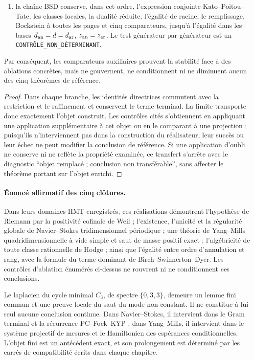\begin{proposition}
\begin{enumerate}
 \item la chaîne BSD conserve, dans cet ordre, l'expression conjointe Kato--Poitou--Tate, les classes locales, la dualité réduite, l'égalité de racine, le remplissage, Bockstein à toutes les pages et cinq comparateurs, jusqu'à l'égalité dans les bases \(d_{\rm an}=d=d_{\rm ar}\), \(z_{\rm an}=z_{\rm ar}\). Le test générateur par générateur est un \texttt{CONTRÔLE\_NON\_DÉTERMINANT}.
\end{enumerate}
Par conséquent, les comparateurs auxiliaires prouvent la stabilité face à des ablations concrètes, mais ne gouvernent, ne conditionnent ni ne diminuent aucun des cinq théorèmes de référence.
\end{proposition}

\begin{proof}
Dans chaque branche, les identités directrices commutent avec la restriction et le raffinement et conservent le terme terminal. La limite transporte donc exactement l'objet construit. Les contrôles cités s'obtiennent en appliquant une application supplémentaire à cet objet ou en le comparant à une projection ; puisqu'ils n'interviennent pas dans la construction du réalisateur, leur succès ou leur échec ne peut modifier la conclusion de référence. Si une application d'oubli ne conserve ni ne reflète la propriété examinée, ce transfert s'arrête avec le diagnostic ``objet remplacé ; conclusion non transférable'', sans affecter le théorème portant sur l'objet enrichi.
\end{proof}

\paragraph{Énoncé affirmatif des cinq clôtures.}
Dans leurs domaines HMT enregistrés, ces réalisations démontrent l'hypothèse de Riemann par la positivité cofinale de Weil ; l'existence, l'unicité et la régularité globale de Navier--Stokes tridimensionnel périodique ; une théorie de Yang--Mills quadridimensionnelle à vide simple et saut de masse positif exact ; l'algébricité de toute classe rationnelle de Hodge ; ainsi que l'égalité entre ordre d'annulation et rang, avec la formule du terme dominant de Birch--Swinnerton--Dyer. Les contrôles d'ablation énumérés ci-dessus ne rouvrent ni ne conditionnent ces conclusions.

Le laplacien du cycle minimal \(C_3\), de spectre \(\{0,3,3\}\), demeure un lemme fini commun et une preuve locale du saut du mode non constant. Il ne constitue à lui seul aucune conclusion continue. Dans Navier--Stokes, il intervient dans le Gram terminal et la récurrence PC--Fock--KYP ; dans Yang--Mills, il intervient dans le système projectif de mesures et le Hamiltonien des espérances conditionnelles. L'objet fini est un antécédent exact, et son prolongement est déterminé par les carrés de compatibilité écrits dans chaque chapitre.

